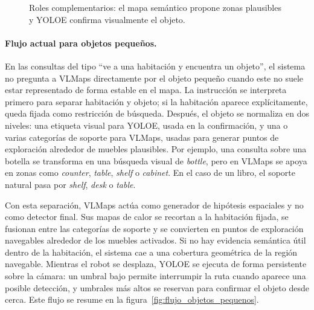 \documentclass[11pt,fleqn,openany]{book} %
\begin{document}
\begin{figure}[ht]
\centering
{}
\caption[Roles complementarios de VLMaps y YOLOE.]{Roles complementarios: el mapa semántico propone zonas plausibles y YOLOE confirma visualmente el objeto.}
\label{fig:vlmaps_yoloe}
\end{figure}

\paragraph{Flujo actual para objetos pequeños.} En las consultas del tipo ``ve a una habitación y encuentra un objeto'', el sistema no pregunta a VLMaps directamente por el objeto pequeño cuando este no suele estar representado de forma estable en el mapa. La instrucción se interpreta primero para separar habitación y objeto; si la habitación aparece explícitamente, queda fijada como restricción de búsqueda. Después, el objeto se normaliza en dos niveles: una etiqueta visual para YOLOE, usada en la confirmación, y una o varias categorías de soporte para VLMaps, usadas para generar puntos de exploración alrededor de muebles plausibles. Por ejemplo, una consulta sobre una botella se transforma en una búsqueda visual de \emph{bottle}, pero en VLMaps se apoya en zonas como \emph{counter}, \emph{table}, \emph{shelf} o \emph{cabinet}. En el caso de un libro, el soporte natural pasa por \emph{shelf}, \emph{desk} o \emph{table}.

Con esta separación, VLMaps actúa como generador de hipótesis espaciales y no como detector final. Sus mapas de calor se recortan a la habitación fijada, se fusionan entre las categorías de soporte y se convierten en puntos de exploración navegables alrededor de los muebles activados. Si no hay evidencia semántica útil dentro de la habitación, el sistema cae a una cobertura geométrica de la región navegable. Mientras el robot se desplaza, YOLOE se ejecuta de forma persistente sobre la cámara: un umbral bajo permite interrumpir la ruta cuando aparece una posible detección, y umbrales más altos se reservan para confirmar el objeto desde cerca. Este flujo se resume en la figura~\ref{fig:flujo_objetos_pequenos}.
\end{document}
